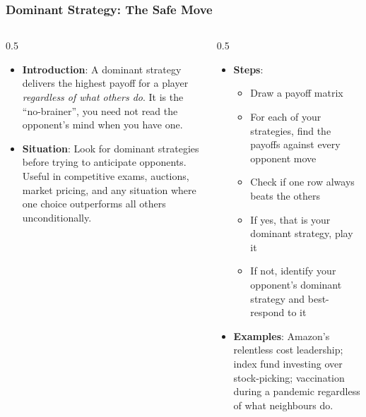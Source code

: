 \begin{frame}[fragile]\frametitle{Dominant Strategy: The Safe Move}
\begin{columns}
    \begin{column}[T]{0.5\linewidth}
      \begin{itemize}
        \item \textbf{Introduction}: A dominant strategy delivers the highest payoff for a player \textit{regardless of what others do}. It is the ``no-brainer'', you need not read the opponent's mind when you have one.
        \item \textbf{Situation}: Look for dominant strategies before trying to anticipate opponents. Useful in competitive exams, auctions, market pricing, and any situation where one choice outperforms all others unconditionally.
      \end{itemize}
    \end{column}
    \begin{column}[T]{0.5\linewidth}
      \begin{itemize}
        \item \textbf{Steps}:
        \begin{itemize}
          \item Draw a payoff matrix
          \item For each of your strategies, find the payoffs against every opponent move
          \item Check if one row always beats the others
          \item If yes, that is your dominant strategy, play it
          \item If not, identify your opponent's dominant strategy and best-respond to it
        \end{itemize}\item \textbf{Examples}: Amazon's relentless cost leadership; index fund investing over stock-picking; vaccination during a pandemic regardless of what neighbours do.
      \end{itemize}
    \end{column}
  \end{columns}
\end{frame}


